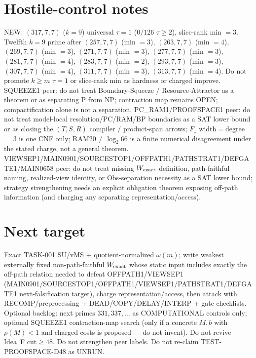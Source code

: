 \documentclass[11pt]{article}
\begin{document}
\section*{Hostile-control notes}
NEW: $(317,7,7)$ ($k{=}9$) universal $\tau{=}1$ ($0/126$ $\tau{\ge}2$), slice-rank min $=3$.
Twelfth $k{=}9$ prime after $(257,7,7)$ (min $=3$), $(263,7,7)$ (min $=4$), $(269,7,7)$ (min $=3$), $(271,7,7)$ (min $=3$), $(277,7,7)$ (min $=3$), $(281,7,7)$ (min $=4$), $(283,7,7)$ (min $=2$), $(293,7,7)$ (min $=3$), $(307,7,7)$ (min $=4$), $(311,7,7)$ (min $=3$), $(313,7,7)$ (min $=4$).
Do not promote $k{\ge}m$ $\tau{=}1$ or slice-rank min as hardness or charged improve.
SQUEEZE1 peer: do not treat Boundary-Squeeze / Resource-Attractor as a theorem or as separating P from NP;
contraction map remains OPEN; compactification alone is not a separation.
PC\_RAM1/PROOFSPACE1 peer: do not treat model-local resolution/PC/RAM/BP boundaries as a SAT lower bound
or as closing the $(T,S,R)$ compiler / product-span arrows; $F_\star$ width$=$degree$=3$ is one CNF only;
RAM$20\neq\log_2 66$ is a finite numerical disagreement under the stated charge, not a general theorem.
VIEWSEP1/MAIN0901/SOURCESTOP1/OFFPATH1/PATHSTRAT1/DEFGATE1/MAIN0658 peer: do not treat missing $W_{\rm exact}$ definition,
path-faithful naming, realized-view identity, or Obs-separation necessity as a SAT lower bound;
strategy strengthening needs an explicit obligation theorem exposing off-path information
(and charging any separating representation/access).

\section*{Next target}
Exact TASK-001 SU/vMS + quotient-normalized $\omega(m)$; write weakest externally fixed non-path-faithful
$W_{\rm exact}$ whose static input includes exactly the off-path relation needed to defeat OFFPATH1/VIEWSEP1
(MAIN0901/SOURCESTOP1/OFFPATH1/VIEWSEP1/PATHSTRAT1/DEFGATE1 next-falsification target), charge representation/access,
then attack with RECOMP/preprocessing + DEAD/COPY/DELAY/INTERP + gate checklists.
Optional backlog: next primes $331,337,\ldots$ as COMPUTATIONAL controls only;
optional SQUEEZE1 contraction-map search (only if a concrete $M,b$ with $\rho(M)<1$ and charged costs is proposed --- do not invent).
Do not revive Idea~F cut$\ge48$. Do not strengthen peer labels.
Do not re-claim TEST-PROOFSPACE-D48 as UNRUN.
\end{document}
